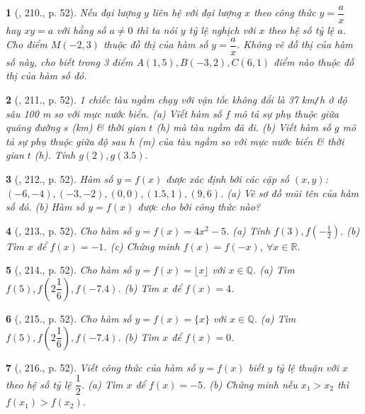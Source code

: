 \documentclass{article}
\newtheorem{baitoan}{}
\begin{document}
\begin{baitoan}[\cite{Tuyen_Toan_8}, 210., p. 52]
	Nếu đại lượng $y$ liên hệ với đại lượng $x$ theo công thức $y = \dfrac{a}{x}$ hay $xy = a$ với hằng số $a\ne0$ thì ta nói $y$ tỷ lệ nghịch với $x$ theo hệ số tỷ lệ $a$. Cho điểm $M(-2,3)$ thuộc đồ thị của hàm số $y = \dfrac{a}{x}$. Không vẽ đồ thị của hàm số này, cho biết trong 3 điểm $A(1,5),B(-3,2),C(6,1)$ điểm nào thuộc đồ thị của hàm số đó.
\end{baitoan}

\begin{baitoan}[\cite{Tuyen_Toan_8}, 211., p. 52]
	1 chiếc tàu ngầm chạy với vận tốc không đổi là {\rm37 km{\tt/}h} ở độ sâu {\rm100 m} so với mực nước biển. (a) Viết hàm số $f$ mô tả sự phụ thuộc giữa quãng đường $s$ ({\rm km}) \& thời gian $t$ ({\rm h}) mà tàu ngầm đã đi. (b) Viết hàm số $g$ mô tả sự phụ thuộc giữa độ sau $h$ ({\rm m}) của tàu ngầm so với mực nước biển \& thời gian $t$ ({\rm h}). Tính $g(2),g(3.5)$.
\end{baitoan}

\begin{baitoan}[\cite{Tuyen_Toan_8}, 212., p. 52]
	Hàm số $y = f(x)$ được xác định bởi các cặp số $(x,y)$: $(-6,-4),(-3,-2),(0,0),(1.5,1),(9,6)$. (a) Vẽ sơ đồ mũi tên của hàm số đó. (b) Hàm số $y = f(x)$ được cho bởi công thức nào?
\end{baitoan}

\begin{baitoan}[\cite{Tuyen_Toan_8}, 213., p. 52]
	Cho hàm số $y = f(x) = 4x^2 - 5$. (a) Tính $f(3),f\left(-\frac{1}{2}\right)$. (b) Tìm $x$ để $f(x) = -1$. (c) Chứng minh $f(x) = f(-x)$, $\forall x\in\mathbb{R}$.
\end{baitoan}

\begin{baitoan}[\cite{Tuyen_Toan_8}, 214., p. 52]
	Cho hàm số $y = f(x) = \lfloor x\rfloor$ với $x\in\mathbb{Q}$. (a) Tìm $f(5),f\left(2\dfrac{1}{6}\right),f(-7.4)$. (b) Tìm $x$ để $f(x) = 4$.
\end{baitoan}

\begin{baitoan}[\cite{Tuyen_Toan_8}, 215., p. 52]
	Cho hàm số $y = f(x) = \{x\}$ với $x\in\mathbb{Q}$. (a) Tìm $f(5),f\left(2\dfrac{1}{6}\right),f(-7.4)$. (b) Tìm $x$ để $f(x) = 0$.
\end{baitoan}

\begin{baitoan}[\cite{Tuyen_Toan_8}, 216., p. 52]
	Viết công thức của hàm số $y = f(x)$ biết $y$ tỷ lệ thuận với $x$ theo hệ số tỷ lệ $\dfrac{1}{2}$. (a) Tìm $x$ để $f(x) = -5$. (b) Chứng minh nếu $x_1 > x_2$ thì $f(x_1) > f(x_2)$.
\end{baitoan}
\end{document}
